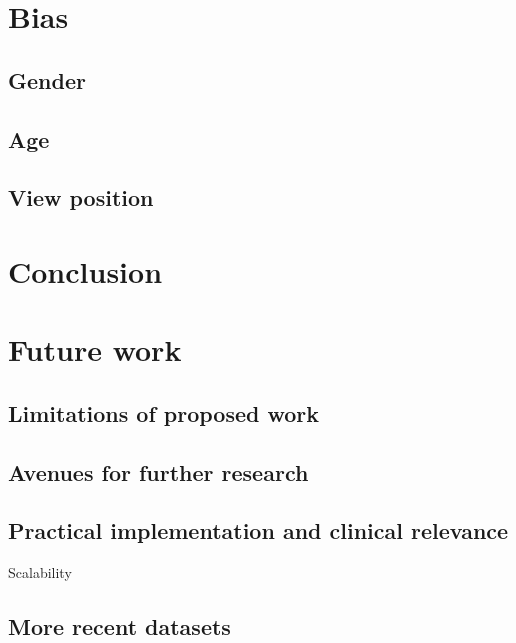 \documentclass[11pt,twoside,a4paper]{report}
\begin{document}
\chapter{Bias}
    \section{Gender}
    \section{Age}
    \section{View position}
\chapter{Conclusion}
\chapter{Future work}
    \section{Limitations of proposed work}
    \section{Avenues for further research}
    \section{Practical implementation and clinical relevance}
    Scalability
    \section{More recent datasets}
\end{document}
